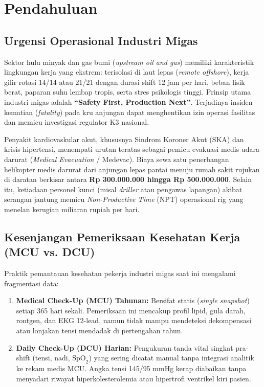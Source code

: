\documentclass[a4paper,11pt]{article}
\begin{document}
\vspace{0.5em}
\noindent\hrulefill
\vspace{1em}

\section{Pendahuluan}

\subsection{Urgensi Operasional Industri Migas}
Sektor hulu minyak dan gas bumi (\textit{upstream oil and gas}) memiliki karakteristik lingkungan kerja yang ekstrem: terisolasi di laut lepas (\textit{remote offshore}), kerja gilir rotasi 14/14 atau 21/21 dengan durasi shift 12 jam per hari, beban fisik berat, paparan suhu lembap tropis, serta stres psikologis tinggi. Prinsip utama industri migas adalah \textbf{``Safety First, Production Next''}. Terjadinya insiden kematian (\textit{fatality}) pada kru anjungan dapat menghentikan izin operasi fasilitas dan memicu investigasi regulator K3 nasional.

Penyakit kardiovaskular akut, khususnya Sindrom Koroner Akut (SKA) dan krisis hipertensi, menempati urutan teratas sebagai pemicu evakuasi medis udara darurat (\textit{Medical Evacuation} / Medevac). Biaya sewa satu penerbangan helikopter medis darurat dari anjungan lepas pantai menuju rumah sakit rujukan di daratan berkisar antara \textbf{Rp 300.000.000 hingga Rp 500.000.000}. Selain itu, ketiadaan personel kunci (misal \textit{driller} atau pengawas lapangan) akibat serangan jantung memicu \textit{Non-Productive Time} (NPT) operasional rig yang menelan kerugian miliaran rupiah per hari.

\subsection{Kesenjangan Pemeriksaan Kesehatan Kerja (MCU vs. DCU)}
Praktik pemantauan kesehatan pekerja industri migas saat ini mengalami fragmentasi data:
\begin{enumerate}[leftmargin=*]
    \item \textbf{Medical Check-Up (MCU) Tahunan:} Bersifat statis (\textit{single snapshot}) setiap 365 hari sekali. Pemeriksaan ini mencakup profil lipid, gula darah, rontgen, dan EKG 12-lead, namun tidak mampu mendeteksi dekompensasi atau lonjakan tensi mendadak di pertengahan tahun.
    \item \textbf{Daily Check-Up (DCU) Harian:} Pengukuran tanda vital singkat pra-shift (tensi, nadi, $\text{SpO}_2$) yang sering dicatat manual tanpa integrasi analitik ke rekam medis MCU. Angka tensi 145/95 mmHg kerap diabaikan tanpa menyadari riwayat hiperkolesterolemia atau hipertrofi ventrikel kiri pasien.
\end{enumerate}
\end{document}
